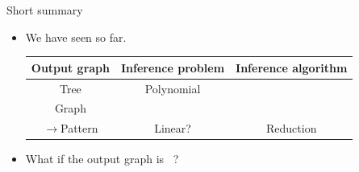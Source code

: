 \documentclass[first=dgreen,second=purple,logo=red]{aaltoslides}
\begin{document}
%
\begin{frame}{Short summary}
	\begin{itemize}\footnotesize
		\item We have seen so far. 
		\begin{tabular}{|c|c|c|}
			\hline
			\footnotesize
			 Output graph & Inference problem & Inference algorithm \\ \hline
			 Tree & Polynomial & \dpg\ \cite{Rousu07}  \\
			 Graph & \nphard & \lbp\ \cite{su10structured}  \\ \hline
			 $\rightarrow$Pattern & Linear? & Reduction \cite{su2015transporter} \\ \hline
		\end{tabular}
		\item What if the output graph is \daggraph\ ?
	\end{itemize}
\end{frame}
\end{document}
